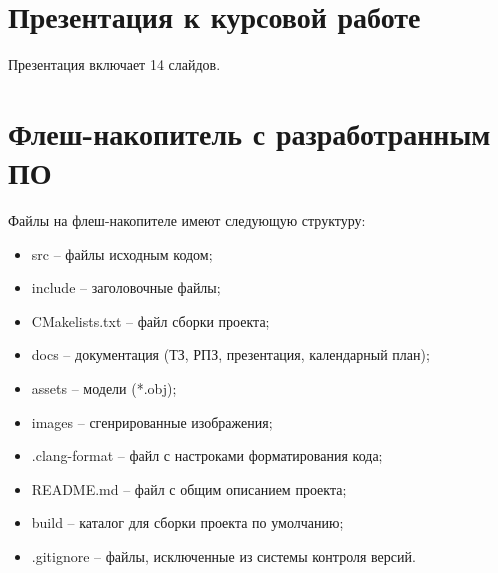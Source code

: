 \begin{appendices}
	\chapter{Презентация к курсовой работе}
	Презентация включает 14 слайдов.

	\chapter{Флеш-накопитель с разработранным ПО}
	Файлы на флеш-накопителе имеют следующую структуру:
	\begin{itemize}
		\item src -- файлы исходным кодом;
		\item include -- заголовочные файлы;
		\item CMakelists.txt -- файл сборки проекта;
		\item docs -- документация (ТЗ, РПЗ, презентация, календарный план);
		\item assets -- модели (*.obj);
		\item images -- сгенрированные изображения;
		\item .clang-format -- файл с настроками форматирования кода;
		\item README.md -- файл с общим описанием проекта;
		\item build -- каталог для сборки проекта по умолчанию;
		\item .gitignore -- файлы, исключенные из системы контроля версий.
	\end{itemize}
\end{appendices}